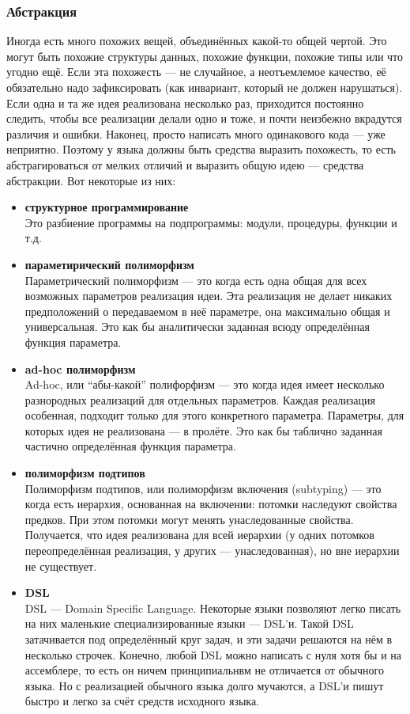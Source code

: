 \documentclass[11pt]{book}
\begin{document}
\subsubsection{Абстракция}
Иногда есть много похожих вещей, объединённых какой-то общей чертой.
Это могут быть похожие структуры данных, похожие функции, похожие типы или что угодно ещё.
Если эта похожесть --- не случайное, а неотъемлемое качество, её обязательно надо зафиксировать
(как инвариант, который не должен нарушаться).
Если одна и та же идея реализована несколько раз, приходится постоянно следить, чтобы все реализации делали одно и тоже,
и почти неизбежно вкрадутся различия и ошибки.
Наконец, просто написать много одинакового кода --- уже неприятно.
Поэтому у языка должны быть средства выразить похожесть,
то есть абстрагироваться от мелких отличий и выразить общую идею --- средства абстракции.
Вот некоторые из них:
\begin{itemize}
\item \textbf{структурное программирование}
    \\
    Это разбиение программы на подпрограммы: модули, процедуры, функции и т.д.
\item \textbf{параметирический полиморфизм}
    \\
    Параметрический полиморфизм --- это когда есть одна общая для всех возможных параметров реализация идеи.
    Эта реализация не делает никаких предположений о передаваемом в неё параметре, она максимально общая и универсальная.
    Это как бы аналитически заданная всюду определённая функция параметра.
\item \textbf{ad-hoc полиморфизм}
    \\
    Ad-hoc, или ``абы-какой'' полифорфизм --- это когда идея имеет несколько разнородных реализаций для отдельных параметров.
    Каждая реализация особенная, подходит только для этого конкретного параметра.
    Параметры, для которых идея не реализована --- в пролёте.
    Это как бы таблично заданная частично определённая функция параметра.
\item \textbf{полиморфизм подтипов}
    \\
    Полиморфизм подтипов, или полиморфизм включения (subtyping) --- это когда есть иерархия, основанная на включении:
    потомки наследуют свойства предков.
    При этом потомки могут менять унаследованные свойства.
    Получается, что идея реализована для всей иерархии (у одних потомков переопределённая реализация, у других --- унаследованная),
    но вне иерархии не существует.
\item \textbf{DSL}
    \\
    DSL --- Domain Specific Language.
    Некоторые языки позволяют легко писать на них маленькие специализированные языки --- DSL'и.
    Такой DSL затачивается под определённый круг задач, и эти задачи решаются на нём в несколько строчек.
    Конечно, любой DSL можно написать с нуля хотя бы и на ассемблере, то есть он ничем принципиальнвм не отличается от обычного языка.
    Но с реализацией обычного языка долго мучаются, а DSL'и пишут быстро и легко за счёт средств исходного языка.
\end{itemize}
\end{document}

